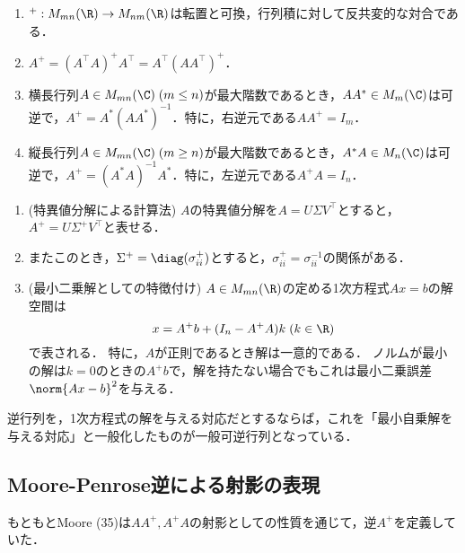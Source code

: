 \documentclass[uplatex, dvipdfmx]{jsreport}
\begin{document}
\begin{proposition}\mbox{}
    \begin{enumerate}
        \item ${}^+:M_{mn}(\R)\to M_{nm}(\R)$は転置と可換，行列積に対して反共変的な対合である．
        \item $A^+=(A^\top A)^+A^\top=A^\top(AA^\top)^+$．
        \item 横長行列$A\in M_{mn}(\C)\;(m\le n)$が最大階数であるとき，$AA^*\in M_m(\C)$は可逆で，$A^+=A^*(AA^*)^{-1}$．特に，右逆元である$AA^+=I_m$．
        \item 縦長行列$A\in M_{mn}(\C)\;(m\ge n)$が最大階数であるとき，$A^*A\in M_n(\C)$は可逆で，$A^+=(A^*A)^{-1}A^*$．特に，左逆元である$A^+A=I_n$．
    \end{enumerate}
\end{proposition}

\begin{proposition}\mbox{}
    \begin{enumerate}
        \item (特異値分解による計算法) $A$の特異値分解を$A=U\Sigma V^\top$とすると，$A^+=U\Sigma^+V^\top$と表せる．
        \item またこのとき，$\Sigma^+=\diag(\sigma_{ii}^+)$とすると，$\sigma_{ii}^+=\sigma_{ii}^{-1}$の関係がある．
        \item (最小二乗解としての特徴付け) $A\in M_{mn}(\R)$の定める1次方程式$Ax=b$の解空間は\[x=A^+b+(I_n-A^+A)k\;(k\in\R)\]で表される．
        特に，$A$が正則であるとき解は一意的である．
        ノルムが最小の解は$k=0$のときの$A^+b$で，解を持たない場合でもこれは最小二乗誤差$\norm{Ax-b}^2$を与える．
    \end{enumerate}
\end{proposition}
\begin{remarks}
    逆行列を，1次方程式の解を与える対応だとするならば，これを「最小自乗解を与える対応」と一般化したものが一般可逆行列となっている．
\end{remarks}

\subsection{Moore-Penrose逆による射影の表現}

\begin{tcolorbox}[colframe=ForestGreen, colback=ForestGreen!10!white,breakable,colbacktitle=ForestGreen!40!white,coltitle=black,fonttitle=\bfseries\sffamily,
title=]
    もともとMoore (35)は$AA^+,A^+A$の射影としての性質を通じて，逆$A^+$を定義していた．
\end{tcolorbox}
\end{document}
